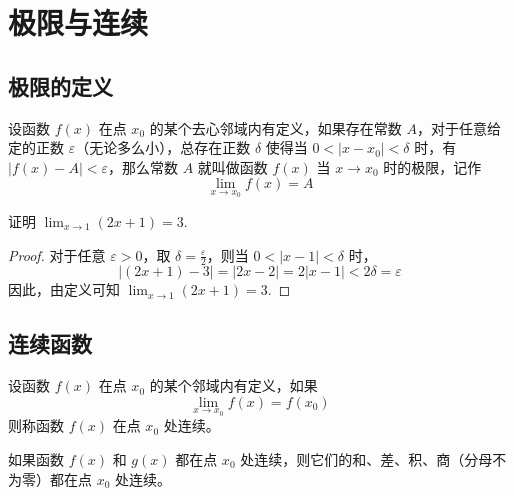 \chapter{极限与连续}

\section{极限的定义}

\begin{definition}[函数的极限]
设函数 \( f(x) \) 在点 \( x_0 \) 的某个去心邻域内有定义，如果存在常数 \( A \)，对于任意给定的正数 \( \varepsilon \)（无论多么小），总存在正数 \( \delta \) 使得当 \( 0 < |x - x_0| < \delta \) 时，有 \( |f(x) - A| < \varepsilon \)，那么常数 \( A \) 就叫做函数 \( f(x) \) 当 \( x \to x_0 \) 时的极限，记作
\[ \lim_{x \to x_0} f(x) = A \]
\end{definition}

\begin{example}
证明 \( \lim_{x \to 1} (2x + 1) = 3 \).
\end{example}

\begin{proof}
对于任意 \( \varepsilon > 0 \)，取 \( \delta = \frac{\varepsilon}{2} \)，则当 \( 0 < |x - 1| < \delta \) 时，
\[ |(2x + 1) - 3| = |2x - 2| = 2|x - 1| < 2\delta = \varepsilon \]
因此，由定义可知 \( \lim_{x \to 1} (2x + 1) = 3 \).
\end{proof}

\section{连续函数}

\begin{definition}[连续]
设函数 \( f(x) \) 在点 \( x_0 \) 的某个邻域内有定义，如果
\[ \lim_{x \to x_0} f(x) = f(x_0) \]
则称函数 \( f(x) \) 在点 \( x_0 \) 处连续。
\end{definition}

\begin{theorem}[连续函数的性质]
如果函数 \( f(x) \) 和 \( g(x) \) 都在点 \( x_0 \) 处连续，则它们的和、差、积、商（分母不为零）都在点 \( x_0 \) 处连续。
\end{theorem}

